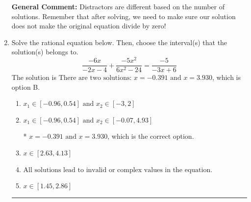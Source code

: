 \documentclass{extbook}[14pt]
\newcommand{\litem}[1]{\item #1

\rule{\textwidth}{0.4pt}}
\begin{document}
\begin{enumerate}
{\begin{enumerate}[label=\Alph*.]
\end{enumerate}

\textbf{General Comment:} Distractors are different based on the number of solutions. Remember that after solving, we need to make sure our solution does not make the original equation divide by zero!
}
\litem{
Solve the rational equation below. Then, choose the interval(s) that the solution(s) belongs to.
\[ \frac{-6x}{-2x -4} + \frac{-5x^{2}}{6x^{2} -24} = \frac{-5}{-3x + 6} \]
The solution is \( \text{There are two solutions: } x = -0.391 \text{ and } x = 3.930 \), which is option B.\begin{enumerate}[label=\Alph*.]
\item \( x_1 \in [-0.96, 0.54] \text{ and } x_2 \in [-3,2] \)


\item \( x_1 \in [-0.96, 0.54] \text{ and } x_2 \in [-0.07,4.93] \)

* $x = -0.391 \text{ and } x = 3.930$, which is the correct option.
\item \( x \in [2.63,4.13] \)


\item \( \text{All solutions lead to invalid or complex values in the equation.} \)


\item \( x \in [1.45,2.86] \)


\end{enumerate}

}
\end{enumerate}
\end{document}
